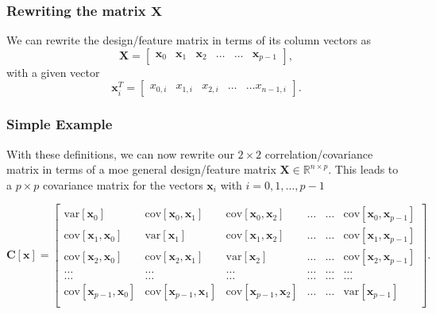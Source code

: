 \documentclass{beamer}
\begin{document}
\begin{frame}
\frametitle{Rewriting the matrix $\bm{X}$}

We can rewrite the design/feature matrix in terms of its column vectors as
\[
\bm{X}=\begin{bmatrix} \bm{x}_0 & \bm{x}_1 & \bm{x}_2 & \dots & \dots & \bm{x}_{p-1}\end{bmatrix},
\]
with a given vector
\[
\bm{x}_i^T = \begin{bmatrix}x_{0,i} & x_{1,i} & x_{2,i}& \dots & \dots x_{n-1,i}\end{bmatrix}.
\]
\end{frame}

\begin{frame}
\frametitle{Simple Example}

With these definitions, we can now rewrite our $2\times 2$
correlation/covariance matrix in terms of a moe general design/feature
matrix $\bm{X}\in {\mathbb{R}}^{n\times p}$. This leads to a $p\times p$
covariance matrix for the vectors $\bm{x}_i$ with $i=0,1,\dots,p-1$

\[
\bm{C}[\bm{x}] = \begin{bmatrix}
\mathrm{var}[\bm{x}_0] & \mathrm{cov}[\bm{x}_0,\bm{x}_1]  & \mathrm{cov}[\bm{x}_0,\bm{x}_2] & \dots & \dots & \mathrm{cov}[\bm{x}_0,\bm{x}_{p-1}]\\
\mathrm{cov}[\bm{x}_1,\bm{x}_0] & \mathrm{var}[\bm{x}_1]  & \mathrm{cov}[\bm{x}_1,\bm{x}_2] & \dots & \dots & \mathrm{cov}[\bm{x}_1,\bm{x}_{p-1}]\\
\mathrm{cov}[\bm{x}_2,\bm{x}_0]   & \mathrm{cov}[\bm{x}_2,\bm{x}_1] & \mathrm{var}[\bm{x}_2] & \dots & \dots & \mathrm{cov}[\bm{x}_2,\bm{x}_{p-1}]\\
\dots & \dots & \dots & \dots & \dots & \dots \\
\dots & \dots & \dots & \dots & \dots & \dots \\
\mathrm{cov}[\bm{x}_{p-1},\bm{x}_0]   & \mathrm{cov}[\bm{x}_{p-1},\bm{x}_1] & \mathrm{cov}[\bm{x}_{p-1},\bm{x}_{2}]  & \dots & \dots  & \mathrm{var}[\bm{x}_{p-1}]\\
\end{bmatrix}.
\]
\end{frame}
\end{document}
